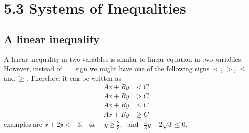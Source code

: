 \chapter{5.3 Systems of Inequalities}
\section{A linear inequality}
A linear inequality in two variables is similar to linear equation in two 
variables. However, instead of $=$ sign we might have one of the following signs 
$<$, $>$, $\leq$ and $\geq$. Therefore, it can be written as
	\begin{align*}
		Ax+By &<C\\
		Ax+By &>C\\
		Ax+By &\leq C\\
		Ax+By &\geq C
	\end{align*}
examples are $x+2y<-3$, \ $4x+y\geq \frac{2}{3}$, \ and \ $\frac{4}{3}
y-2\sqrt{3}\leq 0$.

